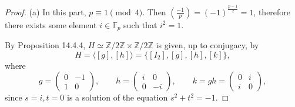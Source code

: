 \documentclass[11pt,a4paper]{article}
\newcommand{\Z}{\mathbb{Z}}
\newcommand{\F}{\mathbb{F}}
\newcommand{\legendre}[2]{\genfrac{(}{)}{}{}{#1}{#2}}
\begin{document}
{\begin{proof}
\item[(a)] In this part, $p \equiv 1 \pmod 4$. Then $\legendre{-1}{p} = (-1)^{\frac{p-1}{2}} = 1$, therefore there exists some element $i \in \F_p$ such that $i^2 = 1$.

By Proposition 14.4.4, $H \simeq \Z/2\Z \times \Z/2\Z$ is given, up to conjugacy, by
$$H = \langle [g],[h] \rangle = \{[I_2], [g],[h],[k]\},$$
where
$$g = \begin{pmatrix} 0 & -1\\1 & 0 \end{pmatrix}, \qquad h = \begin{pmatrix} i & 0 \\0 & -i \end{pmatrix}, \qquad k = gh = \begin{pmatrix} 0 & i\\i & 0 \end{pmatrix}, $$
since $s = i, t = 0$ is a solution of the equation $s^2+t^2 = -1$.


\end{proof}}
\end{document}
